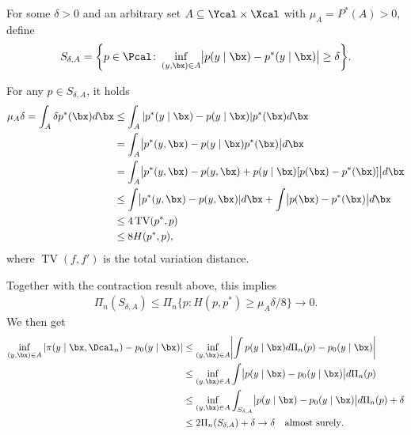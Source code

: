 \documentclass[aspectratio=169,10pt]{beamer}
\newcommand{\currentheading}{\ifx\insertsubsection\empty\insertsection\else\insertsubsection\fi}
\begin{document}
\begin{frame}{\currentheading}
For some $\delta > 0$ and an arbitrary set $A \subseteq \Ycal \times \Xcal$ with $\mu_A = P^*(A) > 0$, define
\begin{align*}
	S_{\delta, A} = \biggl\{p \in \Pcal \colon \inf_{(y, \bx) \in A} \bigl|p(y \mid \bx) - p^*(y \mid \bx) \bigr| \ge \delta\biggr\}.
\end{align*}
\end{frame}

\begin{frame}{\currentheading}
\small
For any $p \in S_{\delta, A}$, it holds
\begin{align*}
	\mu_A \delta = \int_A \delta p^*(\bx) d\bx
	 & \le  \int_A	|p^*(y \mid \bx) - p(y \mid \bx)| p^*(\bx) d\bx                     \\
	 & =  \int_A	\bigl|p^*(y, \bx) - p(y \mid \bx)p^*(\bx)\bigr| d\bx                    \\
	 & =  \int_A	\bigl|p^*(y, \bx) - p(y, \bx) + p(y \mid \bx)[p(\bx) - p^*(\bx)]\bigr| d\bx \\
	 & \le  \int	\bigl|p^*(y, \bx) - p(y, \bx)| d\bx + \int \bigl|p(\bx) - p^*(\bx)\bigr| d\bx \\
	 & \le 4 \operatorname{TV}(p^*, p)                                            \\
	 & \le 8 H(p^*, p),
\end{align*}
where $\operatorname{TV}(f, f')$ is the total variation distance.
\end{frame}

\begin{frame}{\currentheading}
\small
Together with the contraction result above, this implies
\begin{align*}
	\Pi_n(S_{\delta, A}) \le \Pi_n\bigl\{ p \colon H(p, p^*) \ge \mu_A \delta / 8 \bigr\} \to 0.
\end{align*}
We then get
\begin{align*}
	\inf_{(y, \bx) \in A} |\pi(y \mid \bx, \Dcal_n) - p_0(y \mid \bx)|
	 & \le  \inf_{(y, \bx) \in A} \biggl|\int p(y \mid \bx) d\Pi_n(p) - p_0(y \mid \bx)\biggr|                           \\
	 & \le  \inf_{(y, \bx) \in A} \int  \bigl|p(y \mid \bx) - p_0(y \mid \bx) \bigr|   d\Pi_n(p)                         \\
	 & \le  \inf_{(y, \bx) \in A} \int_{S_{\delta, A}} \bigl|p(y \mid \bx) - p_0(y \mid \bx) \bigr|   d\Pi_n(p) + \delta \\
	 & \le 2\Pi_n(S_{\delta, A}) + \delta \to \delta \quad \text{almost surely}.
\end{align*}
\end{frame}
\end{document}
